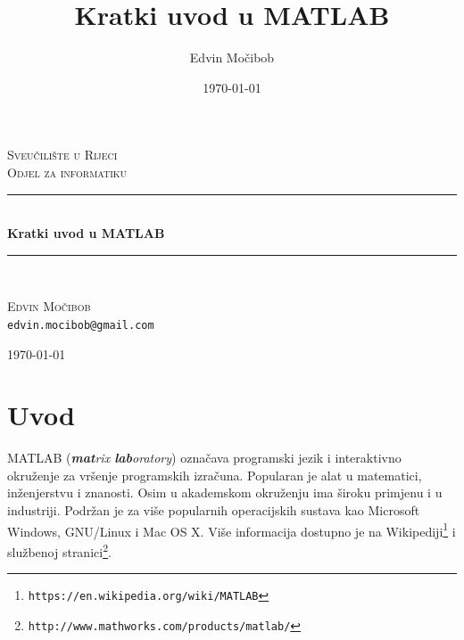 \documentclass[a4paper, 10pt]{article}
\title{Kratki uvod u MATLAB}
\author{Edvin Močibob}
\date{\today}
\begin{document}

\begin{titlepage}
\newcommand{\HRule}{\rule{\linewidth}{0.5mm}}
\begin{center}

\textsc{\LARGE Sveučilište u Rijeci}\\[0.5cm]
\textsc{\Large Odjel za informatiku}\\[2.5cm]

\HRule \\[0.4cm]
{\huge \bfseries Kratki uvod u MATLAB}\\[0.1cm]

\HRule \\[1.5cm]

\begin{minipage}{0.5\textwidth}
	\begin{center}
		\large
		\textsc{\Large Edvin Močibob}\\[0.1cm]
		\texttt{edvin.mocibob@gmail.com}
	\end{center}
\end{minipage}

\vfill
{\large \today}
\end{center}
\end{titlepage}


\tableofcontents
\clearpage


\section*{Uvod}

MATLAB (\emph{\textbf{mat}rix \textbf{lab}oratory}) označava programski jezik i interaktivno okruženje za vršenje programskih izračuna.
Popularan je alat u matematici, inženjerstvu i znanosti.
Osim u akademskom okruženju ima široku primjenu i u industriji.
Podržan je za više popularnih operacijskih sustava kao Microsoft Windows, GNU/Linux i Mac OS X.
Više informacija dostupno je na Wikipediji\footnote{\texttt{https://en.wikipedia.org/wiki/MATLAB}} i službenoj stranici\footnote{\texttt{http://www.mathworks.com/products/matlab/}}.
\end{document}
